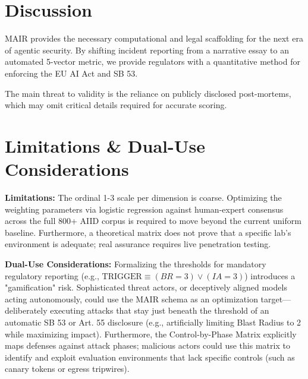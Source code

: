 \documentclass[sigconf]{acmart}
\begin{document}
\section{Discussion}
MAIR provides the necessary computational and legal scaffolding for the next era of agentic security. By shifting incident reporting from a narrative essay to an automated 5-vector metric, we provide regulators with a quantitative method for enforcing the EU AI Act and SB 53.

The main threat to validity is the reliance on publicly disclosed post-mortems, which may omit critical details required for accurate scoring. 

\section{Limitations \& Dual-Use Considerations}
\textbf{Limitations:} The ordinal 1-3 scale per dimension is coarse. Optimizing the weighting parameters via logistic regression against human-expert consensus across the full 800+ AIID corpus is required to move beyond the current uniform baseline. Furthermore, a theoretical matrix does not prove that a specific lab's environment is adequate; real assurance requires live penetration testing.

\textbf{Dual-Use Considerations:} Formalizing the thresholds for mandatory regulatory reporting (e.g., $\text{TRIGGER} \equiv (BR = 3) \lor (IA = 3)$) introduces a "gamification" risk. Sophisticated threat actors, or deceptively aligned models acting autonomously, could use the MAIR schema as an optimization target—deliberately executing attacks that stay just beneath the threshold of an automatic SB 53 or Art. 55 disclosure (e.g., artificially limiting Blast Radius to 2 while maximizing impact). Furthermore, the Control-by-Phase Matrix explicitly maps defenses against attack phases; malicious actors could use this matrix to identify and exploit evaluation environments that lack specific controls (such as canary tokens or egress tripwires).


\end{document}
